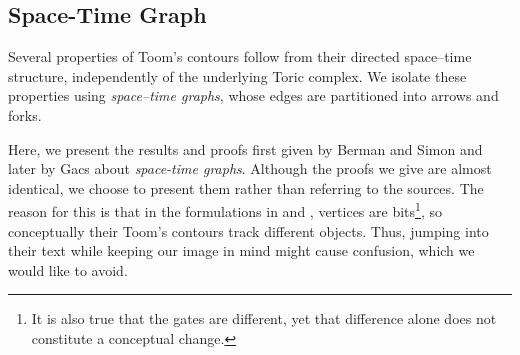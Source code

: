

 \subsection{Space-Time Graph}
  \label{subsection:spacetimegraph}  
  Several properties of Toom's contours follow from their directed space--time structure, independently of the underlying Toric complex. We isolate these properties using \emph{space--time graphs}, whose edges are partitioned into arrows and forks. 
  
  Here, we present the results and proofs first given by Berman and Simon \cite{Berman} and later by Gacs \cite{gacs2021newversiontoomsproof} about \textit{space-time graphs}. Although the proofs we give are almost identical, we choose to present them rather than referring to the sources. The reason for this is that in the formulations in \cite{Berman} and \cite{gacs2021newversiontoomsproof}, vertices are bits\footnote{It is also true that the gates are different, yet that difference alone does not constitute a conceptual change.}, so conceptually their Toom's contours track different objects. Thus, jumping into their text while keeping our image in mind might cause confusion, which we would like to avoid.


